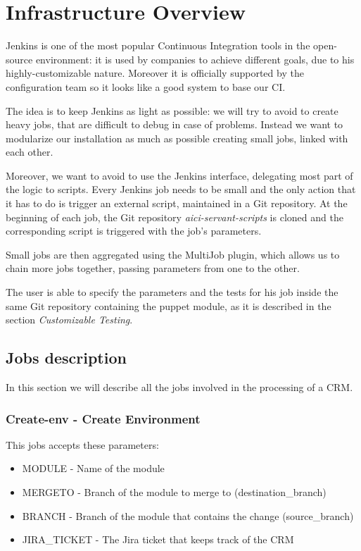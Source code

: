 \section{Infrastructure Overview}

Jenkins is one of the most popular Continuous Integration tools in the
open-source environment: it is used by companies to achieve different goals,
due to his highly-customizable nature. Moreover it is officially supported by
the configuration team so it looks like a good system to base our CI.

The idea is to keep Jenkins as light as possible: we will try to avoid to
create heavy jobs, that are difficult to debug in case of problems. Instead we
want to modularize our installation as much as possible creating small jobs,
linked with each other.

Moreover, we want to avoid to use the Jenkins interface, delegating most part
of the logic to scripts. Every Jenkins job needs to be small and the only
action that it has to do is trigger an external script, maintained in a Git
repository. At the beginning of each job, the Git repository
\textit{aici-servant-scripts} is cloned and the corresponding script is
triggered with the job's parameters.

Small jobs are then aggregated using the MultiJob plugin, which allows us to
chain more jobs together, passing parameters from one to the other.

The user is able to specify the parameters and the tests for his job inside the
same Git repository containing the puppet module, as it is described in the
section \textit{Customizable Testing}.

\subsection{Jobs description}

In this section we will describe all the jobs involved in the processing of
a CRM.

\subsubsection{Create-env - Create Environment}

This jobs accepts these parameters:

\begin{itemize}
  \item MODULE - Name of the module
  \item MERGETO - Branch of the module to merge to (destination\_branch)
  \item BRANCH - Branch of the module that contains the change (source\_branch)
  \item JIRA\_TICKET - The Jira ticket that keeps track of the CRM
\end{itemize}

